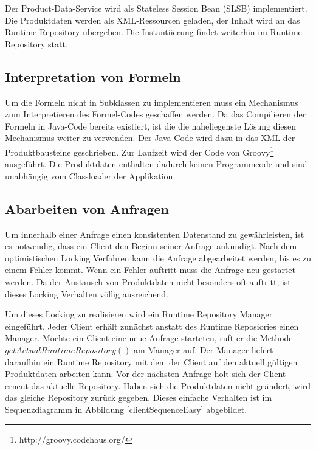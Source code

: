 \documentclass[headsepline=true, footsepline=true]{scrartcl}
\begin{document}
Der Product-Data-Service wird als Stateless Session Bean (SLSB) implementiert.
Die Produktdaten werden als XML-Ressourcen geladen, der Inhalt wird an das
Runtime Repository übergeben. Die Instantiierung findet weiterhin im Runtime
Repository statt.

\subsection{Interpretation von Formeln}

Um die Formeln nicht in Subklassen zu implementieren muss ein Mechanismus zum
Interpretieren des Formel-Codes geschaffen werden. Da das Compilieren der Formeln
in Java-Code bereits existiert, ist die die naheliegenste Lösung diesen
Mechanismus weiter zu verwenden. Der Java-Code wird dazu in das XML der
Produktbausteine geschrieben. Zur Laufzeit wird der Code von
Groovy\footnote{http://groovy.codehaus.org/} ausgeführt. Die Produktdaten
enthalten dadurch keinen Programmcode und sind unabhängig vom Classloader der
Applikation.

\subsection{Abarbeiten von Anfragen}

Um innerhalb einer Anfrage einen konsistenten Datenstand zu gewährleisten, ist es
notwendig, dass ein Client den Beginn seiner Anfrage ankündigt. Nach dem
optimistischen Locking Verfahren kann die Anfrage abgearbeitet werden, bis es zu
einem Fehler kommt. Wenn ein Fehler auftritt muss die Anfrage neu gestartet
werden. Da der Austausch von Produktdaten nicht besonders oft auftritt, ist
dieses Locking Verhalten völlig ausreichend.

Um dieses Locking zu realisieren wird ein Runtime Repository Manager eingeführt.
Jeder Client erhält zunächst anstatt des Runtime Reposiories einen Manager.
Möchte ein Client eine neue Anfrage starteten, ruft er die Methode
$getActualRuntimeRepository()$ am Manager auf. Der Manager liefert daraufhin ein
Runtime Repository mit dem der Client auf den aktuell gültigen Produktdaten
arbeiten kann. Vor der nächsten Anfrage holt sich der Client erneut das aktuelle
Repository. Haben sich die Produktdaten nicht geändert, wird das gleiche
Repository zurück gegeben. Dieses einfache Verhalten ist im Sequenzdiagramm in
Abbildung \ref{clientSequenceEasy} abgebildet.
\end{document}
